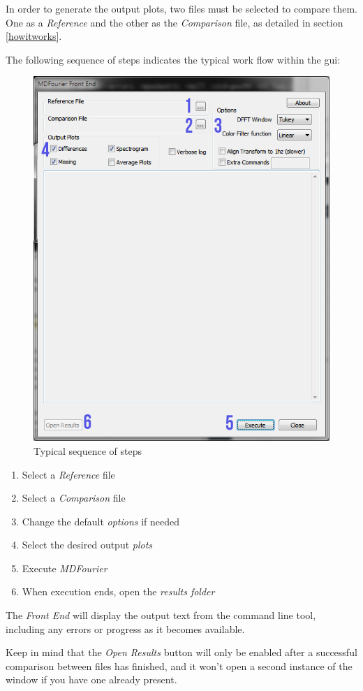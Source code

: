 \documentclass[10pt,a4paper]{report}
\begin{document}
\begin{appendices}
In order to generate the output plots, two files must be selected to compare them. One as a \textit{Reference} and the other as the \textit{Comparison} file, as detailed in section \ref{howitworks}.

The following sequence of steps indicates the typical work flow within the \acrshort{gui}:

\begin{figure}[H]
	\centering
	\includegraphics[width=0.6\linewidth]{images/GUI/GUI2.png}
	\caption[Steps]{Typical sequence of steps}
	\label{fig:gui2}
\end{figure}

\begin{enumerate}
	\item Select a \textit{Reference} file
	\item Select a \textit{Comparison} file
	\item Change the default \textit{options} if needed
	\item Select the desired output \textit{plots}
	\item Execute \textit{MDFourier}
	\item When execution ends, open the \textit{results folder}
\end{enumerate}

The \textit{Front End} will display the output text from the command line tool, including any errors or progress as it becomes available.

Keep in mind that the \textit{Open Results} button will only be enabled after a successful comparison between files has finished, and it won't open a second instance of the window if you have one already present.


\end{appendices}
\end{document}
